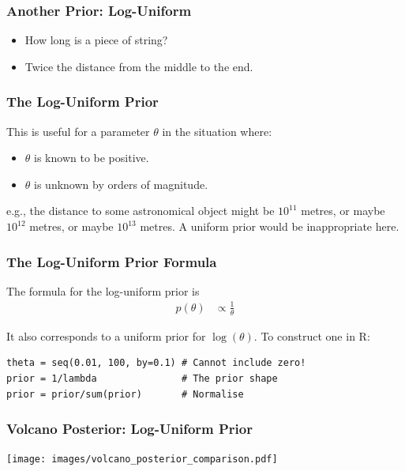 \documentclass{beamer}
\begin{document}
\begin{frame}
\frametitle{Another Prior: Log-Uniform}

\begin{itemize}
\item How long is a piece of string?\pause
\item Twice the distance from the middle to the end.
\end{itemize}

\end{frame}


\begin{frame}
\frametitle{The Log-Uniform Prior}
This is useful for a parameter $\theta$ in the situation where:

\begin{itemize}
\item $\theta$ is known to be positive.\pause
\item $\theta$ is unknown by orders of magnitude.\pause
\end{itemize}
\vspace{0.5em}
e.g., the distance to some astronomical object might be
$10^{11}$ metres, or maybe $10^{12}$ metres, or maybe $10^{13}$
metres. A uniform prior would be inappropriate here.

\end{frame}



\begin{frame}[fragile]
\frametitle{The Log-Uniform Prior Formula}

The formula for the log-uniform prior is
\begin{align}
p(\theta) &\propto \frac{1}{\theta}
\end{align}

It also corresponds to a uniform prior for $\log(\theta)$.
To construct one in R:
\begin{verbatim}
theta = seq(0.01, 100, by=0.1) # Cannot include zero!
prior = 1/lambda               # The prior shape 
prior = prior/sum(prior)       # Normalise
\end{verbatim}

\end{frame}



\begin{frame}[fragile]
\frametitle{Volcano Posterior: Log-Uniform Prior}

\centering
\texttt{[image: images/volcano\_posterior\_comparison.pdf]}


\end{frame}
\end{document}
